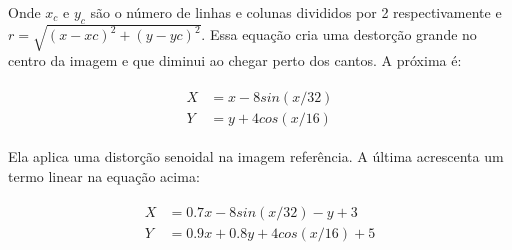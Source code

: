 \documentclass[]{spie}  %
\begin{document}
Onde $x_c$ e $y_c$ são o número de linhas e colunas divididos por 2 respectivamente e $r = \sqrt{(x-xc)^2 + (y-yc)^2}$.
Essa equação cria uma destorção grande no centro da imagem e que diminui ao chegar perto dos cantos. A próxima é:

\begin{align}
\begin{split}
	X &= x - 8sin(x/32) \\
	Y &= y + 4cos(x/16)
\end{split} 
\end{align}

Ela aplica uma distorção senoidal na imagem referência. A última acrescenta um termo linear na equação acima:

\begin{align}
\begin{split}
	X &= 0.7x - 8sin(x/32) - y + 3 \\
	Y &= 0.9x + 0.8 y + 4cos(x/16) + 5
\end{split} 
\end{align}



\end{document}
